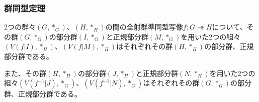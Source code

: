 \documentclass[dvipdfmx]{jsarticle}
\begin{document}
\subsubsection{群同型定理}%
\begin{thm}\label{3.1.2.12}
2つの群々$\left( G,*_{G} \right)$、$\left( H,*_{H} \right)$の間の全射群準同型写像$f:G \twoheadrightarrow H$について、その群$\left( G,*_{G} \right)$の部分群$\left( I,*_{G} \right)$と正規部分群$\left( M,*_{G} \right)$を用いた2つの組々$\left( V\left( f|I \right),*_{H} \right)$、$\left( V\left( f|M \right),*_{H} \right)$はそれぞれその群$\left( H,*_{H} \right)$の部分群、正規部分群である。\par
また、その群$\left( H,*_{H} \right)$の部分群$\left( J,*_{H} \right)$と正規部分群$\left( N,*_{H} \right)$を用いた2つの組々$\left( V\left( f^{- 1}|J \right),*_{G} \right)$、$\left( V\left( f^{- 1}|N \right),*_{G} \right)$はそれぞれその群$\left( G,*_{G} \right)$の部分群、正規部分群である。
\end{thm}
\end{document}
